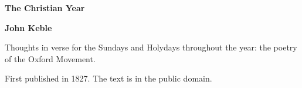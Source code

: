 \documentclass[11pt,letterpaper]{article}
\begin{document}
\color{ink}

\begin{titlepage}
\centering
\vspace*{4em}
{\LARGE\bfseries\color{heading} The Christian Year\par}
\vspace{2em}
{\Large\bfseries\color{heading} John Keble\par}
\vspace{2.5em}
{\itshape\color{subhead}\parbox{0.8\linewidth}{\centering Thoughts in verse for the Sundays and Holydays throughout the year: the poetry of the Oxford Movement.\par}}
\vfill
{\small First published in 1827. The text is in the public domain.\par}
\vspace{2em}
\end{titlepage}

\tableofcontents


\end{document}
